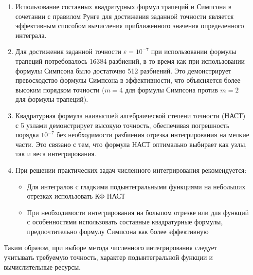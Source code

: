 \documentclass[12pt,a4paper]{article}
\begin{document}
\begin{enumerate}
\item Использование составных квадратурных формул трапеций и Симпсона в сочетании с правилом Рунге для достижения заданной точности является эффективным способом вычисления приближенного значения определенного интеграла.

\item Для достижения заданной точности $\varepsilon = 10^{-7}$ при использовании формулы трапеций потребовалось 16384 разбиений, в то время как при использовании формулы Симпсона было достаточно 512 разбиений. Это демонстрирует превосходство формулы Симпсона в эффективности, что объясняется более высоким порядком точности ($m = 4$ для формулы Симпсона против $m = 2$ для формулы трапеций).

\item Квадратурная формула наивысшей алгебраической степени точности (НАСТ) с 5 узлами демонстрирует высокую точность, обеспечивая погрешность порядка $10^{-7}$ без необходимости разбиения отрезка интегрирования на мелкие части. Это связано с тем, что формула НАСТ оптимально выбирает как узлы, так и веса интегрирования.

\item При решении практических задач численного интегрирования рекомендуется:
   \begin{itemize}
   \item Для интегралов с гладкими подынтегральными функциями на небольших отрезках использовать КФ НАСТ
   \item При необходимости интегрирования на большом отрезке или для функций с особенностями использовать составные квадратурные формулы, предпочтительно формулу Симпсона как более эффективную
   \end{itemize}
\end{enumerate}

Таким образом, при выборе метода численного интегрирования следует учитывать требуемую точность, характер подынтегральной функции и вычислительные ресурсы.

\newpage
\end{document}
